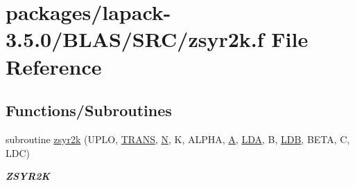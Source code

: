 \hypertarget{lapack-3_85_80_2BLAS_2SRC_2zsyr2k_8f}{}\section{packages/lapack-\/3.5.0/\+B\+L\+A\+S/\+S\+R\+C/zsyr2k.f File Reference}
\label{lapack-3_85_80_2BLAS_2SRC_2zsyr2k_8f}
\subsection*{Functions/\+Subroutines}
\begin{DoxyCompactItemize}
\item 
subroutine \hyperlink{group__complex16__blas__level3_gabe5914922259539af5fa20f324a58add}{zsyr2k} (U\+P\+L\+O, \hyperlink{superlu__enum__consts_8h_a0c4e17b2d5cea33f9991ccc6a6678d62a1f61e3015bfe0f0c2c3fda4c5a0cdf58}{T\+R\+A\+N\+S}, \hyperlink{polmisc_8c_a0240ac851181b84ac374872dc5434ee4}{N}, K, A\+L\+P\+H\+A, \hyperlink{classA}{A}, \hyperlink{example__user_8c_ae946da542ce0db94dced19b2ecefd1aa}{L\+D\+A}, B, \hyperlink{example__user_8c_a50e90a7104df172b5a89a06c47fcca04}{L\+D\+B}, B\+E\+T\+A, C, L\+D\+C)
\begin{DoxyCompactList}\small\item\em {\bfseries Z\+S\+Y\+R2\+K} \end{DoxyCompactList}\end{DoxyCompactItemize}

